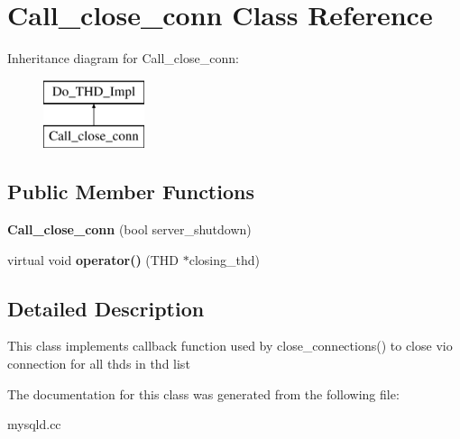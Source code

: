 \hypertarget{classCall__close__conn}{}\section{Call\+\_\+close\+\_\+conn Class Reference}
\label{classCall__close__conn}
Inheritance diagram for Call\+\_\+close\+\_\+conn\+:\begin{figure}[H]
\begin{center}
\leavevmode
\includegraphics[height=2.000000cm]{classCall__close__conn}
\end{center}
\end{figure}
\subsection*{Public Member Functions}
\begin{DoxyCompactItemize}
\item 
\mbox{\label{classCall__close__conn_af1df13942891a24022fa15e8ef460e45}} 
{\bfseries Call\+\_\+close\+\_\+conn} (bool server\+\_\+shutdown)
\item 
\mbox{\label{classCall__close__conn_a9fc5cee7ebbf8768770b98f615c3b8a4}} 
virtual void {\bfseries operator()} (T\+HD $\ast$closing\+\_\+thd)
\end{DoxyCompactItemize}


\subsection{Detailed Description}
This class implements callback function used by close\+\_\+connections() to close vio connection for all thds in thd list 

The documentation for this class was generated from the following file\+:\begin{DoxyCompactItemize}
\item 
mysqld.\+cc\end{DoxyCompactItemize}
